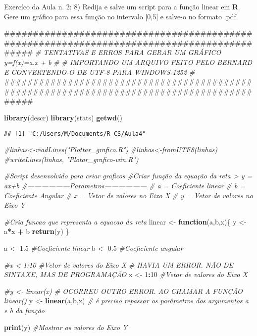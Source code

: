 \documentclass[]{article}
\newenvironment{Shaded}{\begin{snugshade}}{\end{snugshade}}
\newcommand{\KeywordTok}[1]{\textcolor[rgb]{0.13,0.29,0.53}{\textbf{#1}}}
\newcommand{\DecValTok}[1]{\textcolor[rgb]{0.00,0.00,0.81}{#1}}
\newcommand{\FloatTok}[1]{\textcolor[rgb]{0.00,0.00,0.81}{#1}}
\newcommand{\StringTok}[1]{\textcolor[rgb]{0.31,0.60,0.02}{#1}}
\newcommand{\CommentTok}[1]{\textcolor[rgb]{0.56,0.35,0.01}{\textit{#1}}}
\newcommand{\ControlFlowTok}[1]{\textcolor[rgb]{0.13,0.29,0.53}{\textbf{#1}}}
\newcommand{\OperatorTok}[1]{\textcolor[rgb]{0.81,0.36,0.00}{\textbf{#1}}}
\newcommand{\NormalTok}[1]{#1}
\begin{document}
Exercíco da Aula n. 2: 8) Redija e salve um script para a função linear
em \textbf{R}. Gere um gráfico para essa função no intervalo {[}0,5{]} e
salve-o no formato .pdf.

\begin{Shaded}
\begin{Highlighting}[]
\NormalTok{###########################################################################################}
\CommentTok{# TENTATIVAS E  ERROS PARA GERAR UM GRÁFICO y=f(x)=a.x + b }
\CommentTok{#}
\CommentTok{# IMPORTANDO UM ARQUIVO FEITO PELO BERNARD E CONVERTENDO-O DE UTF-8 PARA WINDOWS-1252}
\CommentTok{#}
\NormalTok{###########################################################################################}

\KeywordTok{library}\NormalTok{(descr)}
\KeywordTok{library}\NormalTok{(stats)}
\KeywordTok{getwd}\NormalTok{()}
\end{Highlighting}
\end{Shaded}

\begin{verbatim}
## [1] "C:/Users/M/Documents/R_CS/Aula4"
\end{verbatim}

\begin{Shaded}
\begin{Highlighting}[]
\CommentTok{#linhas<-readLines("Plottar_grafico.R")}
\CommentTok{#linhas<-fromUTF8(linhas)}
\CommentTok{#writeLines(linhas, "Plotar_grafico-win.R")}

\CommentTok{#Script desenvolvido para criar graficos}
\CommentTok{#Criar função da equação da reta > y = ax+b}
\CommentTok{#------------------Parametros------------------}
\CommentTok{#     a = Coeficiente linear}
\CommentTok{#     b = Coeficiente Angular}
\CommentTok{#     x = Vetor de valores no Eixo X}
\CommentTok{#     y = Vetor de valores no Eixo Y}

\CommentTok{#Cria funcao que representa a equacao da reta}
\NormalTok{linear <-}\StringTok{ }\ControlFlowTok{function}\NormalTok{(a,b,x)\{}
\NormalTok{  y <-}\StringTok{ }\NormalTok{a}\OperatorTok{*}\NormalTok{x }\OperatorTok{+}\StringTok{ }\NormalTok{b}
  \KeywordTok{return}\NormalTok{(y)}
\NormalTok{\}}

\NormalTok{a <-}\StringTok{ }\FloatTok{1.5} \CommentTok{#Coeficiente linear}
\NormalTok{b <-}\StringTok{ }\FloatTok{0.5} \CommentTok{#Coeficiente angular}

\CommentTok{#x < 1:10 #Vetor de valores do Eixo X # HAVIA UM ERROR. NÃO DE SINTAXE, MAS DE PROGRAMAÇÃO}
\NormalTok{x <-}\StringTok{ }\DecValTok{1}\OperatorTok{:}\DecValTok{10} \CommentTok{#Vetor de valores do Eixo X}

\CommentTok{#y <- linear(x) # OCORREU OUTRO ERROR. AO CHAMAR A FUNÇÃO linear()}
\NormalTok{y <-}\StringTok{ }\KeywordTok{linear}\NormalTok{(a,b,x) }\CommentTok{# é preciso repassar os parâmetros dos argumentos a e b da função}

\KeywordTok{print}\NormalTok{(y) }\CommentTok{#Mostrar os valores do Eixo Y}
\end{Highlighting}
\end{Shaded}
\end{document}
